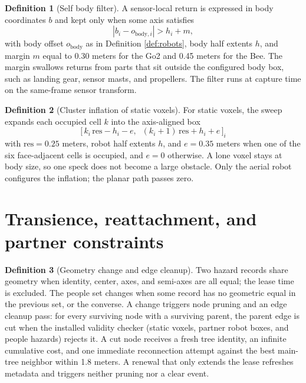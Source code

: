 \documentclass[10pt,a4paper]{article}
\theoremstyle{plain}
\theoremstyle{definition}
\newtheorem{definition}{Definition}[section]
\theoremstyle{remark}
\begin{document}
\begin{definition}[Self body filter]\label{def:selffilter}
A sensor-local return is expressed in body coordinates $b$ and kept only when some axis satisfies
\begin{equation}
|b_i - o_{\mathrm{body},i}| > h_i + m,
\end{equation}
with body offset $o_{\mathrm{body}}$ as in Definition \ref{def:robots}, body half extents $h$, and margin $m$ equal to 0.30 meters for the Go2 and 0.45 meters for the Bee. The margin swallows returns from parts that sit outside the configured body box, such as landing gear, sensor masts, and propellers. The filter runs at capture time on the same-frame sensor transform.
\end{definition}

\begin{definition}[Cluster inflation of static voxels]\label{def:cluster}
For static voxels, the sweep expands each occupied cell $k$ into the axis-aligned box
\begin{equation}
\bigl[\,k_i\,\mathrm{res} - h_i - e,\;\; (k_i + 1)\,\mathrm{res} + h_i + e\,\bigr]_i
\end{equation}
with $\mathrm{res} = 0.25$ meters, robot half extents $h$, and $e = 0.35$ meters when one of the six face-adjacent cells is occupied, and $e = 0$ otherwise. A lone voxel stays at body size, so one speck does not become a large obstacle. Only the aerial robot configures the inflation; the planar path passes zero.
\end{definition}

\section{Transience, reattachment, and partner constraints}

\begin{definition}[Geometry change and edge cleanup]\label{def:cleanup}
Two hazard records share geometry when identity, center, axes, and semi-axes are all equal; the lease time is excluded. The people set changes when some record has no geometric equal in the previous set, or the converse. A change triggers node pruning and an edge cleanup pass: for every surviving node with a surviving parent, the parent edge is cut when the installed validity checker (static voxels, partner robot boxes, and people hazards) rejects it. A cut node receives a fresh tree identity, an infinite cumulative cost, and one immediate reconnection attempt against the best main-tree neighbor within 1.8 meters. A renewal that only extends the lease refreshes metadata and triggers neither pruning nor a clear event.
\end{definition}
\end{document}
